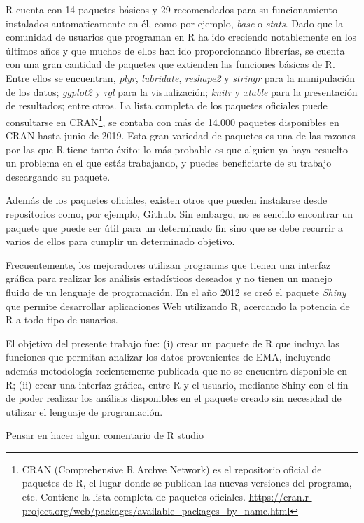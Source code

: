 R cuenta con 14 paquetes básicos y 29 recomendados para su funcionamiento instalados automaticamente en él, como por ejemplo, \emph{base} o \emph{stats}. Dado que la comunidad de usuarios que programan en R ha ido creciendo notablemente en los últimos años y que muchos de ellos han ido proporcionando librerías, se cuenta con una gran cantidad de paquetes que extienden las funciones básicas de R. Entre ellos se encuentran, \emph{plyr}, \emph{lubridate}, \emph{reshape2} y \emph{stringr} para la manipulación de los datos; \emph{ggplot2} y \emph{rgl} para la visualización; \emph{knitr} y \emph{xtable} para la presentación de resultados; entre otros. La lista completa de los paquetes oficiales puede consultarse en CRAN\footnote{CRAN (Comprehensive R Archve Network) es el repositorio oficial de paquetes de R, el lugar donde se publican las nuevas versiones del programa, etc. Contiene la lista completa de paquetes oficiales. \url{https://cran.r-project.org/web/packages/available_packages_by_name.html}}, se contaba con más de 14.000 paquetes disponibles en CRAN hasta junio de 2019. Esta gran variedad de paquetes es una de las razones por las que R tiene tanto éxito: lo más probable es que alguien ya haya resuelto un problema en el que estás trabajando, y puedes beneficiarte de su trabajo descargando su paquete.

Además de los paquetes oficiales, existen otros que pueden instalarse desde repositorios como, por ejemplo, Github. Sin embargo, no es sencillo encontrar un paquete que puede ser útil para un determinado fin sino que se debe recurrir a varios de ellos para cumplir un determinado objetivo. 

Frecuentemente, los mejoradores utilizan programas que tienen una interfaz gráfica para realizar los análisis estadísticos deseados y no tienen un manejo fluido de un lenguaje de programación. En el año 2012 se creó el paquete \emph{Shiny} que permite desarrollar aplicaciones Web utilizando R, acercando la potencia de R a todo tipo de usuarios.

El objetivo del presente trabajo fue: (i) crear un paquete de R que incluya las funciones que permitan analizar los datos provenientes de EMA, incluyendo además metodología recientemente publicada que no se encuentra disponible en R; (ii) crear una interfaz gráfica, entre R y el usuario, mediante Shiny con el fin de poder realizar los análisis disponibles en el paquete creado sin necesidad de utilizar el lenguaje de programación.



{\Huge{Pensar en hacer algun comentario de R studio}}